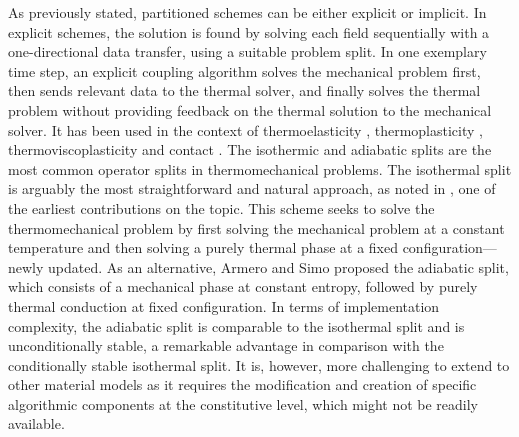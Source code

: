 As previously stated, partitioned schemes can be either explicit or implicit.
In explicit schemes, the solution is found by solving each field sequentially with a one-directional data transfer, using a suitable problem split.
In one exemplary time step, an explicit coupling algorithm solves the mechanical problem first, then sends relevant data to the thermal solver, and finally solves the thermal problem without providing feedback on the thermal solution to the mechanical solver.
It has been used in the context of thermoelasticity \citep{argyris_natural_1981, armero_new_1992, johansson_thermoelastic_1993, miehe_entropic_1995, miehe_theory_1995, holzapfel_entropy_1996}, thermoplasticity \citep{armero_new_1992, armero_priori_1993, simo_associative_1992, wriggers_coupled_1992, agelet_de_saracibar_numerical_1998, agelet_de_saracibar_formulation_1999,lee2015NumericalModelingAnalysis}, thermoviscoplasticity \citep{adam_numerical_2002,adam_thermomechanical_2005,miehe2011CoupledThermoviscoplasticityGlassy} and contact \citep{wriggers1994ContactConstraintsCoupled,agelet_de_saracibar_numerical_1998,xing_three_2002,bergman2004FiniteElementModel}.
The isothermic and adiabatic splits are the most common operator splits in thermomechanical problems.
The isothermal split is arguably the most straightforward and natural approach, as noted in \cite{argyris_natural_1981}, one of the earliest contributions on the topic.
This scheme seeks to solve the thermomechanical problem by first solving the mechanical problem at a constant temperature and then solving a purely thermal phase at a fixed configuration---newly updated.
As an alternative, Armero and Simo \citep{armero_new_1992} proposed the adiabatic split, which consists of a mechanical phase at constant entropy, followed by purely thermal conduction at fixed configuration.
In terms of implementation complexity, the adiabatic split is comparable to the isothermal split and is unconditionally stable, a remarkable advantage in comparison with the conditionally stable isothermal split.
It is, however, more challenging to extend to other material models as it requires the modification and creation of specific algorithmic components at the constitutive level, which might not be readily available.

